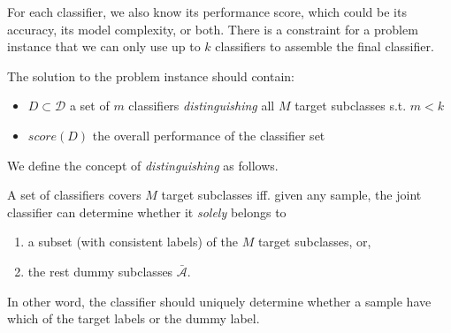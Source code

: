 \documentclass[sigplan,10pt,review]{acmart}\settopmatter{printfolios=true,printccs=false,printacmref=false}
\begin{document}
For each classifier, we also know its performance score, which could be its accuracy, its model complexity, or both.
There is a constraint for a problem instance that we can only use up to $k$ classifiers to assemble the final classifier.

The solution to the problem instance should contain:
\begin{itemize}
	\item $D \subset \mathcal{D}$ a set of $m$ classifiers \textit{distinguishing} all $M$ target subclasses s.t. $m < k$
	\item $score(D)$ the overall performance of the classifier set
\end{itemize}


We define the concept of \textit{distinguishing} as follows.
\begin{definition}
	A set of classifiers covers $M$ target subclasses iff. given any sample, the joint classifier can determine whether it \textit{solely} belongs to \begin{enumerate}
		\item a subset (with consistent labels) of the $M$ target subclasses, or,
		\item the rest dummy subclasses $\bar{\mathcal{A}}$.
	\end{enumerate}
\end{definition}
In other word, the classifier should uniquely determine whether a sample have which of the target labels or the dummy label.
\end{document}
